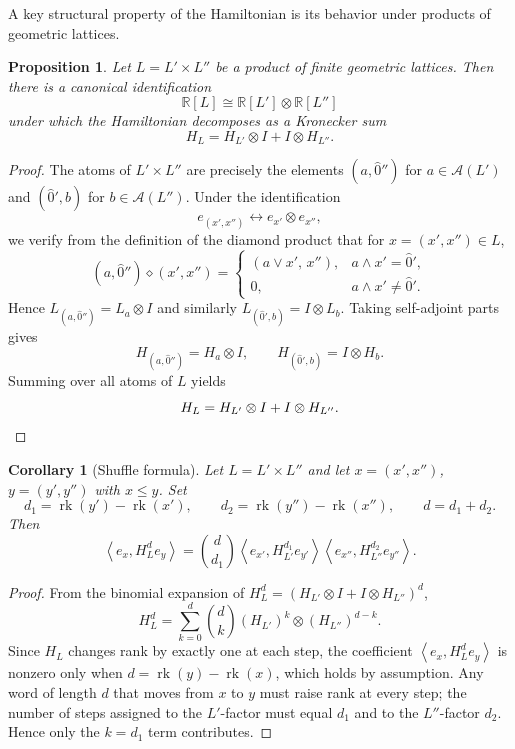 \documentclass[11pt]{amsart}
\newtheorem{prop}[thm]{Proposition}
\newtheorem{cor}[thm]{Corollary}
\theoremstyle{definition}
\DeclareMathOperator{\rk}{rk}
\newcommand{\R}{\mathbb{R}}
\newcommand{\ip}[2]{\left\langle #1, #2 \right\rangle}
\newcommand{\At}{\mathcal{A}}
\newcommand{\zero}{\hat{0}}
\begin{document}
A key structural property of the Hamiltonian is its behavior under products of geometric lattices. 

\begin{prop}\label{prop:product}
Let $L = L' \times L''$ be a product of finite geometric lattices.
Then there is a canonical identification
\[
\R[L] \cong \R[L'] \otimes \R[L'']
\]
under which the Hamiltonian decomposes as a Kronecker sum
\[
H_L = H_{L'} \otimes I + I \otimes H_{L''}.
\]
\end{prop}

\begin{proof}
The atoms of $L' \times L''$ are precisely the elements
$(a, \zero'')$ for $a \in \At(L')$ and $(\zero', b)$ for
$b \in \At(L'')$.  Under the identification
\[
e_{(x',x'')} \leftrightarrow e_{x'} \otimes e_{x''},
\]
we verify from the definition of the diamond product that for
$x = (x', x'') \in L$,
\[
(a,\zero'') \diamond (x',x'')
=
\begin{cases}
(a \vee x',\, x''), & a \wedge x' = \zero',\\
0, & a \wedge x' \neq \zero'.
\end{cases}
\]
Hence $L_{(a,\zero'')} = L_a \otimes I$ and similarly
$L_{(\zero',b)} = I \otimes L_b$.  Taking self-adjoint parts gives
\[
H_{(a,\zero'')} = H_a \otimes I,
\qquad
H_{(\zero',b)} = I \otimes H_b.
\]
Summing over all atoms of $L$ yields
\[
H_L = H_{L'} \otimes I + I \otimes H_{L''}.
\qedhere
\]
\end{proof}

\begin{cor}[Shuffle formula]\label{cor:shuffle}
Let $L = L' \times L''$ and let $x = (x', x'')$, $y = (y', y'')$ with
$x \leq y$.  Set
\[
d_1 = \rk(y') - \rk(x'),
\qquad
d_2 = \rk(y'') - \rk(x''),
\qquad
d = d_1 + d_2.
\]
Then
\[
\ip{e_x}{H_L^d e_y}
=
\binom{d}{d_1}
\ip{e_{x'}}{H_{L'}^{d_1} e_{y'}}
\ip{e_{x''}}{H_{L''}^{d_2} e_{y''}}.
\]
\end{cor}

\begin{proof}
From the binomial expansion of $H_L^d = (H_{L'}\otimes I + I\otimes H_{L''})^d$,
\[
H_L^d = \sum_{k=0}^d \binom{d}{k}
(H_{L'})^k \otimes (H_{L''})^{d-k}.
\]
Since $H_L$ changes rank by exactly one at each step, the coefficient
$\ip{e_x}{H_L^d e_y}$ is nonzero only when $d = \rk(y) - \rk(x)$,
which holds by assumption.  Any word of length $d$ that
moves from $x$ to $y$ must raise rank at every step; the number
of steps assigned to the $L'$-factor must equal $d_1$ and to the
$L''$-factor $d_2$.  Hence only the $k = d_1$ term contributes.
\end{proof}
\end{document}
